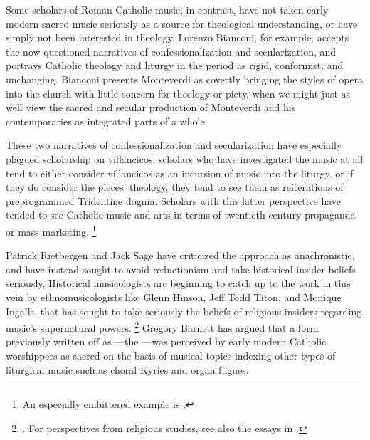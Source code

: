 Some scholars of Roman Catholic music, in contrast, have not taken early modern sacred music seriously as a source for theological understanding, or have simply not been interested in theology. 
Lorenzo Bianconi, for example, accepts the now questioned narratives of confessionalization and secularization, and portrays Catholic theology and liturgy in the period as rigid, conformist, and unchanging.%
	\autocite{Bianconi:17C}
Bianconi presents Monteverdi as covertly bringing the  styles of opera into the church with little concern for theology or piety, when we might just as well view the sacred and secular production of Monteverdi and his contemporaries as integrated parts of a whole.

These two narratives of confessionalization and secularization have especially plagued scholarship on villancicos: scholars who have investigated the music at all tend to either consider villancicos as an incursion of   music into the liturgy, or if they do consider the pieces' theology, they tend to see them as reiterations of preprogrammed Tridentine dogma.
Scholars with this latter perspective have tended to see Catholic music and arts in terms of twentieth-century propaganda or mass marketing.%
	\footnote{%
	An especially embittered example is \autocite{Menache:Vox}.
	}

Patrick Rietbergen and Jack Sage have criticized the  approach as anachronistic, and have instead sought to avoid reductionism and take historical insider beliefs seriously.%
	\autocites{Rietbergen:Power}{Sage:Instrumentum}
Historical musicologists are beginning to catch up to the work in this vein by ethnomusicologists like Glenn Hinson, Jeff Todd Titon, and Monique Ingalls, that has sought to take seriously the beliefs of religious insiders regarding music's supernatural powers.%
	\footnote{%
	\autocites{Hinson:Fire}{Titon:Powerhouse}{Ingalls:Awesome}.
	For perspectives from religious studies, see also the essays in \autocite{McCutcheon:InsiderOutsider}.
	}
Gregory Barnett has argued that a form previously written off as ---the ---was perceived by early modern Catholic worshippers as sacred on the basis of musical topics indexing other types of liturgical music such as choral Kyries and organ fugues.%
	\autocite{Barnett:Bolognese}

